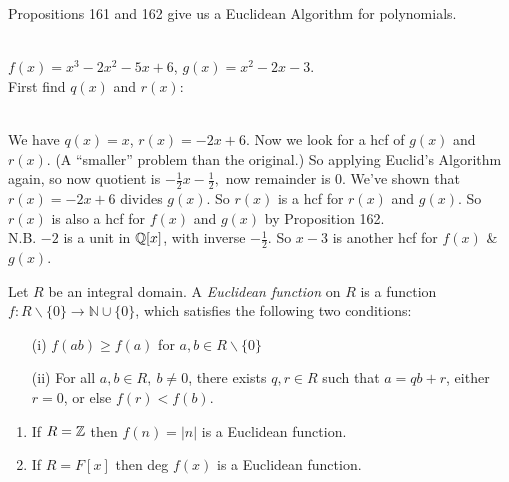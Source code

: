\documentclass[twoside]{scrartcl}
\begin{document}
 Propositions 161 and 162 give us a Euclidean Algorithm for polynomials. \\

\begin{example} \\$f(x) = x^3 - 2x^2 -5x + 6$, $g(x) = x^2 - 2x -3$.\\
First find $q(x)$ and $r(x)$:\\
~

 We have $q(x) = x$, $r(x) = -2x + 6$. Now we look for a hcf of $g(x)$ and $r(x).$ (A ``smaller'' problem than the original.) So applying Euclid's Algorithm again, so now quotient is $-\frac{1}{2}x - \frac{1}{2} ,$ now remainder is $0$. We've shown that $r(x) = -2x + 6$ divides $g(x)$. So $r(x)$ is a hcf for $r(x)$ and $g(x)$. So $r(x)$ is also a hcf for $f(x)$ and $g(x)$ by Proposition 162.\\

N.B. $-2$ is a unit in $\mathbb{Q}[x]$, with inverse $-\frac{1}{2}$. So $x-3$ is another hcf for $f(x)$ \& $g(x)$.
\end{example}



\begin{definition} Let  
 $R$ be an integral domain. A \emph{Euclidean function} on $R$ is a function $f: R\backslash\{0\} \to \mathbb{N} \cup \{0\}$, which satisfies the following two conditions: \begin{enumerate}
 \item[(i)] $f(ab) \geq f(a)$ for $a,b \in R\backslash\{0\}$
 \item[(ii)] For all $a,b \in R,~b \neq 0$, there exists $q,r \in R$ such that $a = qb + r$, either $r = 0$, or else $f(r) < f(b)$.	
 \end{enumerate}\end{definition}

\begin{examples} \begin{enumerate}
 \item If $R = \mathbb{Z}$ then $f(n) = |n|$ is a Euclidean function. 
 \item If $R = F[x]$ then deg $f(x)$ is a Euclidean function.	
 \end{enumerate}\end{examples}
 \vspace*{5pt}
\end{document}
